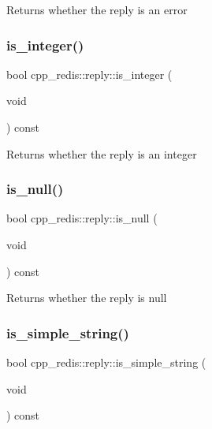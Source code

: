 \begin{DoxyReturn}{Returns}
whether the reply is an error 
\end{DoxyReturn}
\mbox{\label{classcpp__redis_1_1reply_a75216234d6aafd8f81025b22bdbb4440}} 
\subsubsection{\texorpdfstring{is\+\_\+integer()}{is\_integer()}}
{\footnotesize\ttfamily bool cpp\+\_\+redis\+::reply\+::is\+\_\+integer (\begin{DoxyParamCaption}\item[{void}]{ }\end{DoxyParamCaption}) const}

\begin{DoxyReturn}{Returns}
whether the reply is an integer 
\end{DoxyReturn}
\mbox{\label{classcpp__redis_1_1reply_ac9a967c09aad1cdc7ec3459a330ab274}} 
\subsubsection{\texorpdfstring{is\+\_\+null()}{is\_null()}}
{\footnotesize\ttfamily bool cpp\+\_\+redis\+::reply\+::is\+\_\+null (\begin{DoxyParamCaption}\item[{void}]{ }\end{DoxyParamCaption}) const}

\begin{DoxyReturn}{Returns}
whether the reply is null 
\end{DoxyReturn}
\mbox{\label{classcpp__redis_1_1reply_aeb92f6f84d226239e9800893ab6062ca}} 
\subsubsection{\texorpdfstring{is\+\_\+simple\+\_\+string()}{is\_simple\_string()}}
{\footnotesize\ttfamily bool cpp\+\_\+redis\+::reply\+::is\+\_\+simple\+\_\+string (\begin{DoxyParamCaption}\item[{void}]{ }\end{DoxyParamCaption}) const}


